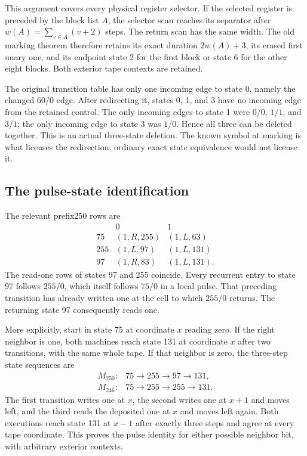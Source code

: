 This argument covers every physical register selector.  If the selected
register is preceded by the block list $A$, the selector scan reaches its
separator after $w(A)=\sum_{v\in A}(v+2)$ steps.  The return scan has the
same width.  The old marking theorem therefore retains its exact duration
$2w(A)+3$, its erased first unary one, and its endpoint state 2 for the
first block or state 6 for the other eight blocks.  Both exterior tape
contexts are retained.

The original transition table has only one incoming edge to state 0,
namely the changed $60/0$ edge.  After redirecting it, states 0, 1, and 3
have no incoming edge from the retained control.  The only incoming edges
to state 1 were $0/0$, $1/1$, and $3/1$; the only incoming edge to state 3
was $1/0$.  Hence all three can be deleted together.  This is an actual
three-state deletion.  The known symbol at marking is what licenses the
redirection; ordinary exact state equivalence would not license it.

\subsection{The pulse-state identification}

The relevant prefix250 rows are
\[
\begin{array}{c|cc}
 &0&1\\\hline
75 &(1,R,255)&(1,L,63)\\
255&(1,L,97)&(1,L,131)\\
97 &(1,R,83)&(1,L,131).
\end{array}
\]
The read-one rows of states 97 and 255 coincide.  Every recurrent entry
to state 97 follows $255/0$, which itself follows $75/0$ in a local pulse.
That preceding transition has already written one at the cell to which
$255/0$ returns.  The returning state 97 consequently reads one.

More explicitly, start in state 75 at coordinate $x$ reading zero.
If the right neighbor is one, both machines reach state 131 at coordinate
$x$ after two transitions, with the same whole tape.  If that neighbor is
zero, the three-step state sequences are
\[
 \begin{array}{rcl}
 M_{250}:&75\longrightarrow255\longrightarrow97\longrightarrow131,\\
 M_{246}:&75\longrightarrow255\longrightarrow255\longrightarrow131.
 \end{array}
\]
The first transition writes one at $x$, the second writes one at $x+1$
and moves left, and the third reads the deposited one at $x$ and moves
left again.  Both executions reach state 131 at $x-1$ after exactly three
steps and agree at every tape coordinate.  This proves the pulse identity
for either possible neighbor bit, with arbitrary exterior contexts.

